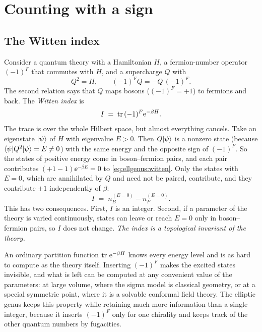 \section{Counting with a sign}\label{sec:ellgenus:index}

\subsection{The Witten index}

Consider a quantum theory with a Hamiltonian $H$, a fermion-number operator $(-1)^F$ that
commutes with $H$, and a supercharge $Q$ with
\begin{equation}\label{eq:ellgenus:susy}
 Q^2 = H,\qquad (-1)^F Q = -Q\,(-1)^F .
\end{equation}
The second relation says that $Q$ maps bosons ($(-1)^F=+1$) to fermions and back. The
\emph{Witten index} is
\begin{equation}\label{eq:ellgenus:witten}
 I \;=\; \operatorname{tr}\,(-1)^F \mathrm{e}^{-\beta H}.
\end{equation}
The trace is over the whole Hilbert space, but almost everything cancels. Take an
eigenstate $|\psi\rangle$ of $H$ with eigenvalue $E>0$. Then $Q|\psi\rangle$ is a nonzero state
(because $\langle \psi|Q^2|\psi\rangle=E\ne0$) with the same energy and the opposite sign of
$(-1)^F$. So the states of positive energy come in boson--fermion pairs, and each pair
contributes $(+1-1)\ee^{-\beta E}=0$ to \eqref{eq:ellgenus:witten}. Only the states with
$E=0$, which are annihilated by $Q$ and need not be paired, contribute, and they contribute
$\pm1$ independently of $\beta$:
\begin{equation}\label{eq:ellgenus:index_count}
 I \;=\; n_B^{(E=0)} - n_F^{(E=0)} .
\end{equation}
This has two consequences. First, $I$ is an integer. Second, if a parameter of the theory is
varied continuously, states can leave or reach $E=0$ only in boson--fermion pairs, so $I$
does not change. \emph{The index is a topological invariant of the theory.}

\begin{physicsbox}
An ordinary partition function $\operatorname{tr}\,\mathrm{e}^{-\beta H}$ knows every energy level and is as hard
to compute as the theory itself. Inserting $(-1)^F$ makes the excited states invisible, and
what is left can be computed at any convenient value of the parameters: at large volume, where
the sigma model is classical geometry, or at a special symmetric point, where it is a
solvable conformal field theory. The elliptic genus keeps this property while retaining much
more information than a single integer, because it inserts $(-1)^F$ only for one chirality
and keeps track of the other quantum numbers by fugacities.
\end{physicsbox}

